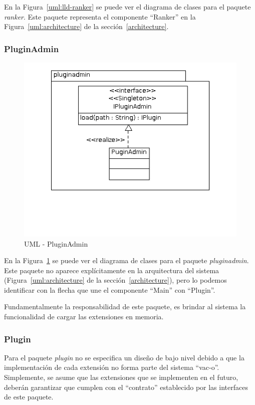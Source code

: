  En la Figura~\ref{uml:lld-ranker} se puede ver el diagrama de clases
para el paquete \textit{ranker}. Este paquete representa el componente
``Ranker'' en la Figura~\ref{uml:architecture} de la
secci\'on~\ref{architecture}.

  \subsubsection{PluginAdmin}
  \begin{figure}
      \centering
      \includegraphics[scale=0.5]{lld-pluginadmin.png}  
      \caption{UML - PluginAdmin}
      \label{uml:lld-pluginadmin}
    \end{figure}

  En la Figura~\ref{uml:lld-pluginadmin} se puede ver el diagrama de clases
para el paquete \textit{pluginadmin}. Este paquete no aparece expl\'icitamente
en la arquitectura del sistema (Figura~\ref{uml:architecture} de la
secci\'on~\ref{architecture}), pero lo podemos identificar con la flecha que une
el componente ``Main'' con ``Plugin''.

  Fundamentalmente la responsabilidad de este paquete, es brindar al sistema la
funcionalidad de cargar las extensiones en memoria.

  \subsubsection{Plugin}
  Para el paquete \textit{plugin} no se especifica un dise\~no de bajo nivel
debido a que la implementaci\'on de cada extensi\'on no forma parte del sistema
``vac-o''. Simplemente, se asume que las extensiones que se implementen en el
futuro, deber\'an garantizar que cumplen con el ``contrato'' establecido por
las interfaces de este paquete.
